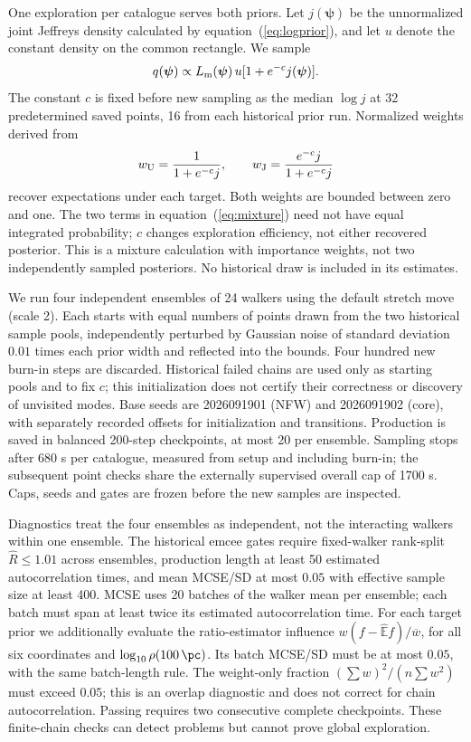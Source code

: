 One exploration per catalogue serves both priors. Let $j(\boldsymbol\psi)$ be the unnormalized joint Jeffreys density calculated by equation~(\ref{eq:logprior}), and let $u$ denote the constant density on the common rectangle. We sample
\begin{equation}
 q(\boldsymbol\psi)\propto L_{\rm m}(\boldsymbol\psi)\,u
                          [1+e^{-c}j(\boldsymbol\psi)] .
 \label{eq:mixture}
\end{equation}
The constant $c$ is fixed before new sampling as the median $\log j$ at 32 predetermined saved points, 16 from each historical prior run. Normalized weights derived from
\begin{equation}
 w_{\rm U}=\frac{1}{1+e^{-c}j},\qquad
 w_{\rm J}=\frac{e^{-c}j}{1+e^{-c}j}
 \label{eq:weights}
\end{equation}
recover expectations under each target. Both weights are bounded between zero and one. The two terms in equation~(\ref{eq:mixture}) need not have equal integrated probability; $c$ changes exploration efficiency, not either recovered posterior. This is a mixture calculation with importance weights, not two independently sampled posteriors. No historical draw is included in its estimates.

We run four independent ensembles of 24 walkers using the default stretch move (scale 2). Each starts with equal numbers of points drawn from the two historical sample pools, independently perturbed by Gaussian noise of standard deviation $0.01$ times each prior width and reflected into the bounds. Four hundred new burn-in steps are discarded. Historical failed chains are used only as starting pools and to fix $c$; this initialization does not certify their correctness or discovery of unvisited modes. Base seeds are 2026091901 (NFW) and 2026091902 (core), with separately recorded offsets for initialization and transitions. Production is saved in balanced 200-step checkpoints, at most 20 per ensemble. Sampling stops after 680 s per catalogue, measured from setup and including burn-in; the subsequent point checks share the externally supervised overall cap of 1700 s. Caps, seeds and gates are frozen before the new samples are inspected.

Diagnostics treat the four ensembles as independent, not the interacting walkers within one ensemble. The historical emcee gates require fixed-walker rank-split $\widehat R\leq1.01$ across ensembles, production length at least 50 estimated autocorrelation times, and mean MCSE/SD at most $0.05$ with effective sample size at least 400. MCSE uses 20 batches of the walker mean per ensemble; each batch must span at least twice its estimated autocorrelation time. For each target prior we additionally evaluate the ratio-estimator influence $w(f-\widehat{\mathbb E}f)/\overline w$, for all six coordinates and $\log_{10}\rho(100\,\pc)$. Its batch MCSE/SD must be at most $0.05$, with the same batch-length rule. The weight-only fraction $(\sum w)^2/(n\sum w^2)$ must exceed $0.05$; this is an overlap diagnostic and does not correct for chain autocorrelation. Passing requires two consecutive complete checkpoints. These finite-chain checks can detect problems but cannot prove global exploration.

